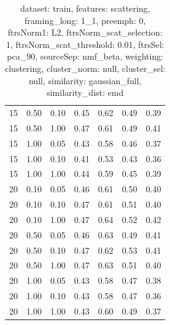 \documentclass[12pt,a4paper,fleqn]{tufte-handout}
\begin{document}
\begin{table}
\begin{center}
\begin{tabular}{lllcccc}
15 & 0.50 & 0.10 & 0.45 & 0.62 & 0.49 & 0.39 \\          
15 & 0.50 & 1.00 & 0.47 & 0.61 & 0.49 & 0.41 \\          
15 & 1.00 & 0.05 & 0.43 & 0.58 & 0.46 & 0.37 \\          
15 & 1.00 & 0.10 & 0.41 & 0.53 & 0.43 & 0.36 \\          
15 & 1.00 & 1.00 & 0.44 & 0.59 & 0.45 & 0.39 \\          
20 & 0.10 & 0.05 & 0.46 & 0.61 & 0.50 & 0.40 \\          
20 & 0.10 & 0.10 & 0.47 & 0.61 & 0.51 & 0.40 \\          
20 & 0.10 & 1.00 & 0.47 & 0.64 & 0.52 & 0.42 \\          
20 & 0.50 & 0.05 & 0.46 & 0.63 & 0.49 & 0.41 \\          
20 & 0.50 & 0.10 & 0.47 & 0.62 & 0.53 & 0.41 \\          
20 & 0.50 & 1.00 & 0.47 & 0.63 & 0.51 & 0.40 \\          
20 & 1.00 & 0.05 & 0.43 & 0.58 & 0.47 & 0.38 \\          
20 & 1.00 & 0.10 & 0.43 & 0.58 & 0.47 & 0.36 \\          
20 & 1.00 & 1.00 & 0.43 & 0.60 & 0.49 & 0.37 \\          
\end{tabular}          
\end{center}          
\caption{dataset: train, features: scattering, framing\_long: 1\_1, preemph: 0, ftrsNorm1: L2, ftrsNorm\_scat\_selection: 1, ftrsNorm\_scat\_threshold: 0.01, ftrsSel: pca\_90, sourceSep: nmf\_beta, weighting: clustering, cluster\_norm: null, cluster\_sel: null, similarity: gaussian\_full, similarity\_dist: emd}          
\label{datasetrFeaturscFraminlong1_1Preemp0Ftrsnorm1L2Ftrsnoscatselect1Ftrsnoscatthresh0.01Ftrsselpc90SourcesepnmbeWeightclClustenormnuClusteselnuSimilagafuSimiladistem}          
\end{table}          
 
\end{document}
